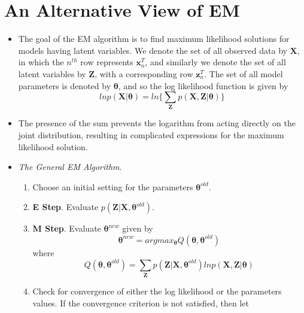 \documentclass[12pt, a4paper]{article}
\begin{document}
    \section{An Alternative View of EM}
    \begin{itemize}
        \item The goal of the EM algorithm is to find maximum likelihood solutions for 
        models having latent variables. We denote the set of all observed data by 
        $\mathbf{X}$, in which the $n^{th}$ row represents $\bm{x}_n^T$, and similarly
        we denote the set of all latent variables by $\mathbf{Z}$, with a corresponding
        row $\bm{z}_n^T$. The set of all model parameters is denoted by $\bm{\theta}$, 
        and so the log likelihood function is given by
        \begin{equation}
            ln p(\mathbf{X}|\bm{\theta})=ln\Big\{\sum_{\mathbf{Z}}p(\mathbf{X},
            \mathbf{Z}|\bm{\theta}) \Big\}
        \end{equation}
        \item The presence of the sum prevents the logarithm from acting directly on the 
        joint distribution, resulting in complicated expressions for the maximum likelihood
        solution. 
        \item \textit{The General EM Algorithm}. \begin{enumerate}
            \item Choose an initial setting for the parameters $\bm{\theta}^{old}$.
            \item \textbf{E Step}. Evaluate $p(\mathbf{Z}|\mathbf{X},\bm{\theta}^{old})$.
            \item \textbf{M Step}. Evaluate $\bm{\theta}^{new}$ given by 
            \begin{equation*}
                \bm{\theta}^{new}=argmax_{\bm{\theta}} Q(\bm{\theta},\bm{\theta}^{old})
            \end{equation*}
            where \begin{equation*}
                Q(\bm{\theta},\bm{\theta}^{old})=\sum_{\mathbf{Z}}p(\mathbf{Z}|\mathbf{X},
                \bm{\theta}^{old})ln p(\mathbf{X},\mathbf{Z}|\bm{\theta})
            \end{equation*}
            \item Check for convergence of either the log likelihood or the parameters values.
            If the convergence criterion is not satisfied, then let
            \begin{equation*}

\end{equation*}
\end{enumerate}
\end{itemize}
\end{document}
